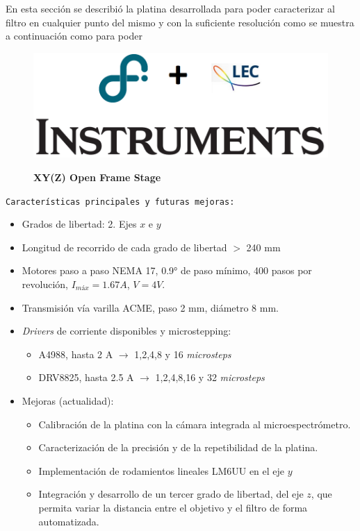 En esta sección se describió la platina desarrollada para poder caracterizar al filtro en cualquier punto del mismo y con la suficiente resolución como se muestra a continuación como para poder 

\newpage
\begin{figure}[H]
\begin{minipage}{0.47\textwidth}
\centering
\includegraphics[width=.7\textwidth,left]{Figs/microespectrometro/descarga.png}
\end{minipage}
\hfill
\begin{minipage}{0.47\textwidth}
\raggedleft
\Huge \textbf{XY(Z) Open Frame Stage}
\end{minipage}
\end{figure}

\texttt{Características principales y futuras mejoras:}

    \begin{itemize}
        \item Grados de libertad: 2. Ejes $\textit{x}$ e $\textit{y}$  
        \item Longitud de recorrido de cada grado de libertad $>$ 240 mm
        \item Motores paso a paso NEMA 17, 0.9° de paso mínimo, 400 pasos por revolución, $I_{máx} = 1.67 A$, $V = 4V$.
        \item Transmisión vía varilla ACME, paso 2 mm, diámetro 8 mm.
        \item \textit{Drivers} de corriente disponibles y microstepping:
\begin{itemize}
\item A4988, hasta 2 A $\xrightarrow{}$ 1,2,4,8 y 16  \textit{microsteps}
\item DRV8825, hasta 2.5 A $\xrightarrow{}$ 1,2,4,8,16 y 32 \textit{microsteps}
\end{itemize}
    \item Mejoras (actualidad):
    \begin{itemize}
 	\item Calibración de la platina con la cámara integrada al microespectrómetro.
 	\item Caracterización de la precisión y de la repetibilidad de la platina.
        \item Implementación de rodamientos lineales LM6UU en el eje $\textit{y}$
        \item Integración y desarrollo de un tercer grado de libertad, del eje $\textit{z}$, que permita variar la distancia entre el objetivo y el filtro de forma automatizada.
        \end{itemize}
\end{itemize}
\newpage


